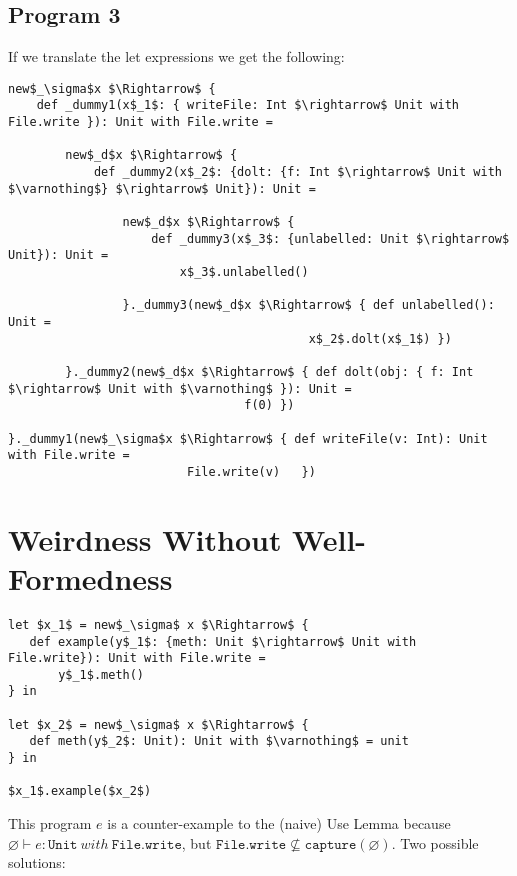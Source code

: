 \documentclass{llncs}
\newcommand{\keywadj}[1]{\mathtt{#1}}
\newcommand{\kwa}[1]{\keywadj{ #1 }}
\begin{document}
\subsection{Program 3}

If we translate the let expressions we get the following:

\begin{lstlisting}
new$_\sigma$x $\Rightarrow$ {
    def _dummy1(x$_1$: { writeFile: Int $\rightarrow$ Unit with File.write }): Unit with File.write =
      
        new$_d$x $\Rightarrow$ {
            def _dummy2(x$_2$: {dolt: {f: Int $\rightarrow$ Unit with $\varnothing$} $\rightarrow$ Unit}): Unit =
                
                new$_d$x $\Rightarrow$ {
                    def _dummy3(x$_3$: {unlabelled: Unit $\rightarrow$ Unit}): Unit =
                        x$_3$.unlabelled()
                        
                }._dummy3(new$_d$x $\Rightarrow$ { def unlabelled(): Unit =
                                          x$_2$.dolt(x$_1$) })
            
        }._dummy2(new$_d$x $\Rightarrow$ { def dolt(obj: { f: Int $\rightarrow$ Unit with $\varnothing$ }): Unit =
                                 f(0) })
      
}._dummy1(new$_\sigma$x $\Rightarrow$ { def writeFile(v: Int): Unit with File.write =
                         File.write(v)   })
\end{lstlisting}

\section{Weirdness Without Well-Formedness}


\begin{lstlisting}
let $x_1$ = new$_\sigma$ x $\Rightarrow$ {
   def example(y$_1$: {meth: Unit $\rightarrow$ Unit with File.write}): Unit with File.write =
       y$_1$.meth()
} in

let $x_2$ = new$_\sigma$ x $\Rightarrow$ {
   def meth(y$_2$: Unit): Unit with $\varnothing$ = unit
} in

$x_1$.example($x_2$)
\end{lstlisting}

\noindent
This program $e$ is a counter-example to the (naive) Use Lemma because $\varnothing \vdash e : \kwa{Unit}~with~\kwa{File.write}$, but $\kwa{File.write} \not\subseteq \kwa{capture}(\varnothing)$. Two possible solutions:
\end{document}
